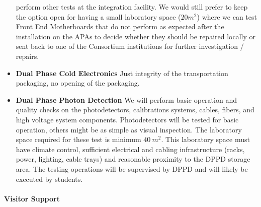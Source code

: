 \begin{itemize}
perform other tests at the integration facility. We would still prefer to keep the option open for 
having a small laboratory space ($20 m^2$) where we can test Front End Motherboards that do not 
perform as expected after the installation on the APAs to decide whether they should be repaired 
locally or sent back to one of the Consortium institutions for further investigation / repairs.
   \item {\bf Dual Phase Cold Electronics} Just integrity of the transportation packaging, 
no opening of the packaging.
   \item {\bf Dual Phase Photon Detection} We will perform basic operation and quality checks on 
the photodetectors, calibrations systems, cables, fibers, and high voltage system components. 
Photodetectors will be tested for basic operation, others might be as simple as visual inspection. 
The laboratory space required for these test is minimum $40~m^2$. This laboratory space must 
have climate control, sufficient electrical and cabling infrastructure (racks, power, lighting, cable 
trays) and reasonable proximity to the DPPD storage area. The testing operations will be supervised 
by DPPD and will likely be executed by students.
\end{itemize}

\paragraph{\bf Visitor Support} 

